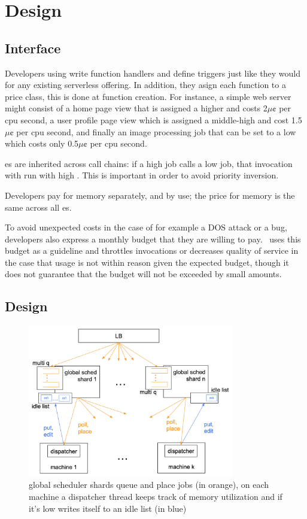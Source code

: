 \section{Design}\label{design}


\subsection{Interface}


Developers using \sys{} write function handlers and define triggers just like
they would for any existing serverless offering. In addition, they asign each
function to a price class, this is done at function creation. For instance, a
simple web server might consist of a home page view that is assigned a higher
\priceclass{} and costs 2$\mu\cent$ per cpu second, a user profile page view
which is assigned a middle-high \class{} and cost 1.5$\mu\cent$ per cpu second,
and finally an image processing job that can be set to a low \class{} which
costs only 0.5$\mu\cent$ per cpu second.

\Class{}es are inherited across call chains: if a high \class{} job calls a low
\class{} job, that invocation with run with high \class{}. This is important in
order to avoid priority inversion.

Developers pay for memory separately, and by use; the price for memory is the
same across all \class{}es.

To avoid unexpected costs in the case of for example a DOS attack or a bug,
developers also express a monthly budget that they are willing to pay.\ \sys{}
uses this budget as a guideline and throttles invocations or decreases quality
of service in the case that usage is not within reason given the expected
budget, though it does not guarantee that the budget will not be exceeded by
small amounts.



\subsection{\Sys{} Design}

\begin{figure}[t]
    \centering
      \includegraphics[width=9cm]{img/overview.png}
      \caption{ global scheduler shards queue and place jobs (in orange), 
      on each machine a dispatcher thread keeps track of memory utilization 
      and if it's low writes itself to an idle list (in blue) }
    \label{fig:overview}
\end{figure}



